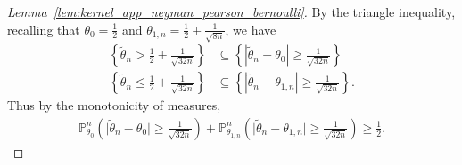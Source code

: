 \documentclass[11pt,lof]{puthesis}
\renewcommand{\P}{\ensuremath{\mathbb{P}}}
\theoremstyle{break}
\theoremstyle{proof}
\newtheorem{proof}{Proof}
\begin{document}
\begin{proof}[Lemma~\ref{lem:kernel_app_neyman_pearson_bernoulli}]
%
By the triangle inequality,
recalling that
$\theta_0 = \frac{1}{2}$
and $\theta_{1,n} = \frac{1}{2} + \frac{1}{\sqrt{8n}}$,
we have
%
\begin{align*}
\left\{
\tilde \theta_n > \frac{1}{2} + \frac{1}{\sqrt{32n}}
\right\}
&\subseteq
\left\{
\left| \tilde \theta_n - \theta_0 \right|
\geq \frac{1}{\sqrt{32n}}
\right\} \\
\left\{
\tilde \theta_n \leq \frac{1}{2} + \frac{1}{\sqrt{32n}}
\right\}
&\subseteq
\left\{
\left| \tilde \theta_n - \theta_{1,n} \right|
\geq \frac{1}{\sqrt{32n}}
\right\}.
\end{align*}
%
Thus by the monotonicity of measures,
%
\begin{align*}
\P_{\theta_0}^n \left(
\big| \tilde \theta_n - \theta_0 \big|
\geq \frac{1}{\sqrt{32n}}
\right)
+ \P_{\theta_{1,n}}^n \left(
\big| \tilde \theta_n - \theta_{1,n} \big|
\geq \frac{1}{\sqrt{32n}}
\right)
\geq \frac{1}{2}.
\end{align*}
\end{proof}
\end{document}
